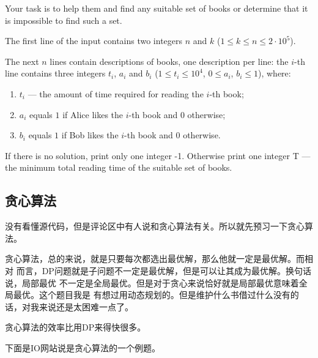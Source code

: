 Your task is to help them and find any suitable set of books or determine that it is impossible to find such a set.

The first line of the input contains two integers $n$ and $k$ ($1\le k\le n\le 2\cdot 10^5$).

The next $n$ lines contain descriptions of books, one description per line: the $i$-th line contains three integers $t_i$, $a_i$ and $b_i$ ($1\le t_i\le 10^4$, $0\le a_i$, $b_i\le 1$), where:

\begin{enumerate}
\item $t_i$ --- the amount of time required for reading the $i$-th book;
\item $a_i$ equals $1$ if Alice likes the $i$-th book and $0$ otherwise;
\item $b_i$ equals $1$ if Bob likes the $i$-th book and $0$ otherwise.
\end{enumerate}

If there is no solution, print only one integer -1. Otherwise print one integer T — the minimum total reading time of the suitable set of books.

\subsection{贪心算法}

没有看懂源代码，但是评论区中有人说和贪心算法有关。所以就先预习一下贪心算法。

贪心算法，总的来说，就是只要每次都选出最优解，那么他就一定是最优解。而相对
而言，DP问题就是子问题不一定是最优解，但是可以让其成为最优解。换句话说，局部最优
不一定是全局最优。但是对于贪心来说恰好就是局部最优意味着全局最优。这个题目我是
有想过用动态规划的。但是维护什么书借过什么没有的话，对我来说还是太困难一点了。

贪心算法的效率比用DP来得快很多。

下面是IO网站说是贪心算法的一个例题。

